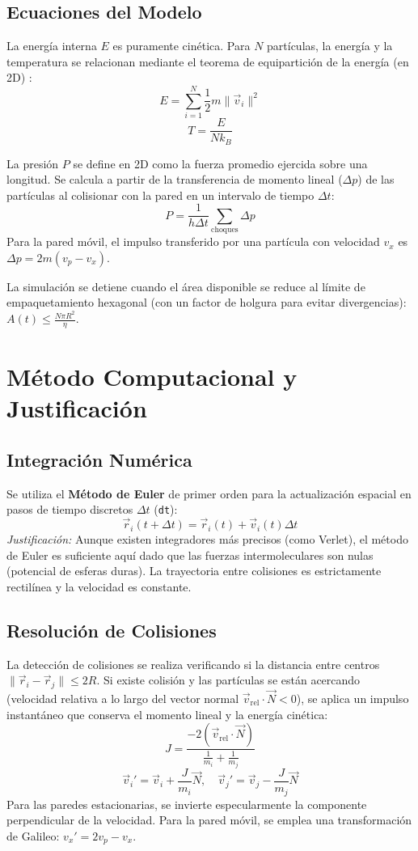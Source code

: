 \documentclass[12pt,a4paper]{article}
\begin{document}
\subsection*{Ecuaciones del Modelo}
La energía interna $E$ es puramente cinética. Para $N$ partículas, la energía y la temperatura se relacionan mediante el teorema de equipartición de la energía (en 2D) \cite{schroeder1999thermal}:
$$ E = \sum_{i=1}^{N} \frac{1}{2} m \|\vec{v}_i\|^2 $$
$$ T = \frac{E}{N k_B} $$

La presión $P$ se define en 2D como la fuerza promedio ejercida sobre una longitud. Se calcula a partir de la transferencia de momento lineal ($\Delta p$) de las partículas al colisionar con la pared en un intervalo de tiempo $\Delta t$:
$$ P = \frac{1}{h \Delta t} \sum_{\text{choques}} \Delta p $$
Para la pared móvil, el impulso transferido por una partícula con velocidad $v_x$ es $\Delta p = 2m(v_p - v_x)$.

La simulación se detiene cuando el área disponible se reduce al límite de empaquetamiento hexagonal (con un factor de holgura para evitar divergencias): $A(t) \leq \frac{N \pi R^2}{\eta}$.

\section{Método Computacional y Justificación}

\subsection*{Integración Numérica}
Se utiliza el \textbf{Método de Euler} de primer orden para la actualización espacial en pasos de tiempo discretos $\Delta t$ (\texttt{dt}):
$$ \vec{r}_i(t + \Delta t) = \vec{r}_i(t) + \vec{v}_i(t) \Delta t $$
\textit{Justificación:} Aunque existen integradores más precisos (como Verlet), el método de Euler es suficiente aquí dado que las fuerzas intermoleculares son nulas (potencial de esferas duras). La trayectoria entre colisiones es estrictamente rectilínea y la velocidad es constante.

\subsection*{Resolución de Colisiones}
La detección de colisiones se realiza verificando si la distancia entre centros $\|\vec{r}_i - \vec{r}_j\| \leq 2R$. 
Si existe colisión y las partículas se están acercando (velocidad relativa a lo largo del vector normal $\vec{v}_{\text{rel}} \cdot \vec{N} < 0$), se aplica un impulso instantáneo que conserva el momento lineal y la energía cinética:
$$ J = \frac{-2 (\vec{v}_{\text{rel}} \cdot \vec{N})}{\frac{1}{m_i} + \frac{1}{m_j}} $$
$$ \vec{v}_i' = \vec{v}_i + \frac{J}{m_i} \vec{N}, \quad \vec{v}_j' = \vec{v}_j - \frac{J}{m_j} \vec{N} $$
Para las paredes estacionarias, se invierte especularmente la componente perpendicular de la velocidad. Para la pared móvil, se emplea una transformación de Galileo: $v_x' = 2v_p - v_x$.
\end{document}
